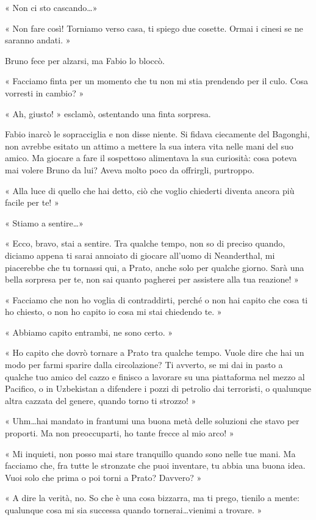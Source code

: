 « Non ci sto cascando\ldots »

« Non fare così! Torniamo verso casa, ti spiego due cosette. Ormai i cinesi se ne saranno andati. »

Bruno fece per alzarsi, ma Fabio lo bloccò.

« Facciamo finta per un momento che tu non mi stia prendendo per il culo. Cosa vorresti in cambio? »

« Ah, giusto! » esclamò, ostentando una finta sorpresa.

Fabio inarcò le sopracciglia e  non disse niente. Si fidava ciecamente del Bagonghi, non avrebbe esitato un attimo a mettere la sua intera vita nelle mani del suo amico. Ma giocare a fare il sospettoso alimentava la sua curiosità: cosa poteva mai volere Bruno da lui? Aveva molto poco da offrirgli, purtroppo.

« Alla luce di quello che hai detto, ciò che voglio chiederti diventa ancora più facile per te! »

« Stiamo a sentire\ldots »

« Ecco, bravo, stai a sentire. Tra qualche tempo, non so di preciso quando, diciamo appena ti sarai annoiato di giocare all'uomo di Neanderthal, mi piacerebbe che tu tornassi qui, a Prato, anche solo per qualche giorno. Sarà una bella sorpresa per te, non sai quanto pagherei per assistere alla tua reazione! »

« Facciamo che non ho voglia di contraddirti, perché o non hai capito che cosa ti ho chiesto, o non ho capito io cosa mi stai chiedendo te. »

« Abbiamo capito entrambi, ne sono certo. »

« Ho capito che dovrò tornare a Prato tra qualche tempo. Vuole dire che hai un modo per farmi sparire dalla circolazione? Ti avverto, se mi dai in pasto a qualche tuo amico del cazzo e finisco a lavorare su una piattaforma nel mezzo al Pacifico, o in Uzbekistan a difendere i pozzi di petrolio dai terroristi, o qualunque altra cazzata del genere, quando torno ti strozzo! »

« Uhm\ldots hai mandato in frantumi una buona metà delle soluzioni che stavo per proporti. Ma non preoccuparti, ho tante frecce al mio arco! »

« Mi inquieti, non posso mai stare tranquillo quando sono nelle tue mani. Ma facciamo che, fra tutte le stronzate che puoi inventare, tu abbia una buona idea. Vuoi solo che prima o poi torni a Prato? Davvero? »

« A dire la verità, no. So che è una cosa bizzarra, ma ti prego, tienilo a mente: qualunque cosa mi sia successa quando tornerai\ldots vienimi a trovare. »

